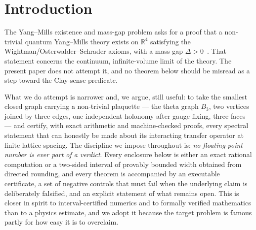 \documentclass[aps,prd,twocolumn,superscriptaddress,nofootinbib]{revtex4-2}
\begin{document}
\maketitle

\section{Introduction}\label{sec:intro}

The Yang--Mills existence and mass-gap problem asks for a proof that a
non-trivial quantum Yang--Mills theory exists on $\mathbb{R}^4$ satisfying
the Wightman/Osterwalder--Schrader axioms, with a mass gap
$\Delta > 0$~\cite{JaffeWitten}. That statement concerns the continuum,
infinite-volume limit of the theory. The present paper does not attempt
it, and no theorem below should be misread as a step toward the
Clay-sense predicate.

What we do attempt is narrower and, we argue, still useful: to take the
smallest closed graph carrying a non-trivial plaquette --- the theta graph
$B_3$, two vertices joined by three edges, one independent holonomy after
gauge fixing, three faces --- and certify, with exact arithmetic and
machine-checked proofs, every spectral statement that can honestly be made
about its interacting transfer operator at finite lattice spacing. The
discipline we impose throughout is: \emph{no floating-point number is ever
part of a verdict}. Every enclosure below is either an exact rational
computation or a two-sided interval of provably bounded width obtained
from directed rounding, and every theorem is accompanied by an executable
certificate, a set of negative controls that must fail when the underlying
claim is deliberately falsified, and an explicit statement of what remains
open. This is closer in spirit to interval-certified numerics and to
formally verified mathematics than to a physics estimate, and we adopt it
because the target problem is famous partly for how easy it is to
overclaim.
\end{document}
